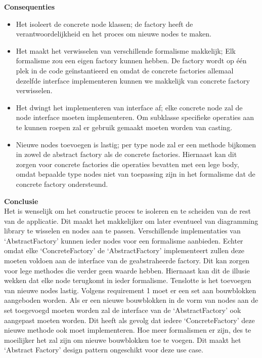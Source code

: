\noindent\textbf{Consequenties}
\begin{itemize}
    \item Het isoleert de concrete node klassen; de factory heeft de verantwoordelijkheid en het proces om nieuwe nodes te maken.
    \item Het maakt het verwisselen van verschillende formalisme makkelijk; Elk formalisme zou een eigen factory kunnen hebben. De factory wordt op één plek in de code geïnstantieerd en omdat de concrete factories allemaal dezelfde interface implementeren kunnen we makkelijk van concrete factory verwisselen.
    \item Het dwingt het implementeren van interface af; elke concrete node zal de node interface moeten implementeren. Om subklasse specifieke operaties aan te kunnen roepen zal er gebruik gemaakt moeten worden van casting.
    \item Nieuwe nodes toevoegen is lastig; per type node zal er een methode bijkomen in zowel de abstract factory als de concrete factories. Hiernaast kan dit zorgen voor concrete factories die operaties bevatten met een lege body, omdat bepaalde type nodes niet van toepassing zijn in het formalisme dat de concrete factory ondersteund.
\end{itemize}

\noindent\textbf{Conclusie}\\
Het is wenselijk om het constructie proces te isoleren en te scheiden van de rest van de applicatie. Dit maakt het makkelijker om later eventueel van diagramming library te wisselen en nodes aan te passen. Verschillende implementaties van ‘AbstractFactory’ kunnen ieder nodes voor een formalisme aanbieden. Echter omdat elke ‘ConcreteFactory’ de ‘AbstractFactory’ implementeert zullen deze moeten voldoen aan de interface van de geabstraheerde factory. Dit kan zorgen voor lege methodes die verder geen waarde hebben. Hiernaast kan dit de illusie wekken dat elke node terugkomt in ieder formalisme. Tenslotte is het toevoegen van nieuwe nodes lastig. Volgens requirement 1 moet er een set aan bouwblokken aangeboden worden. Als er een nieuwe bouwblokken in de vorm van nodes aan de set toegevoegd moeten worden zal de interface van de ‘AbstractFactory’ ook aangepast moeten worden. Dit heeft als gevolg dat iedere ‘ConcreteFactory’ deze nieuwe methode ook moet implementeren. Hoe meer formalismen er zijn, des te moeilijker het zal zijn om nieuwe bouwblokken toe te voegen. Dit maakt het ‘Abstract Factory’ design pattern ongeschikt voor deze use case.

